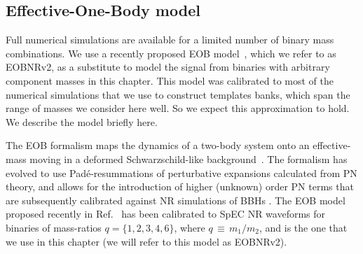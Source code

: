 \subsection{Effective-One-Body model}\label{s2:EOBwaveforms}


Full numerical simulations are available for a limited number of binary 
mass combinations. We use a recently proposed EOB 
model~\cite{BuonannoEOBv2Main}, which we refer to as EOBNRv2, as a substitute
to model the signal from binaries with arbitrary component masses
in this chapter. This model was calibrated to most of the numerical simulations
that we use to construct templates banks, which span the range of masses 
we consider here well. So we expect this approximation to hold. We describe the
model briefly here.

The EOB formalism maps the dynamics of a two-body system onto an effective-mass
moving in a deformed Schwarzschild-like background~\cite{EOBOriginalBuonannoDamour}.
The formalism has evolved to use Pad\'{e}-resummations of perturbative 
expansions calculated from PN theory, and allows for the introduction of higher
(unknown) order PN terms that are subsequently calibrated against NR 
simulations of BBHs 
\cite{EOBdevel01,EOBdevel02,EOBNRdevel03,DamourFluxhlm01,EOBNRdevel01}. The EOB 
model proposed recently in Ref.~\cite{BuonannoEOBv2Main} has been calibrated 
to SpEC NR waveforms for binaries of mass-ratios $q=\{1,2,3,4,6\}$, where 
$q\,\equiv \, m_1/m_2$, and is the one that we use in this chapter (we will refer
to this model as EOBNRv2).

